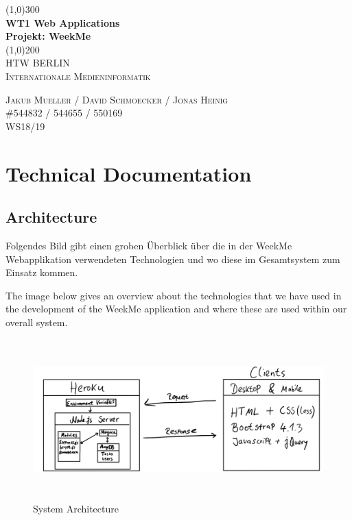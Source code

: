\documentclass[11pt]{article}
\begin{document}
\begin{titlepage} 
	\begin{center}
	\line(1,0){300} \\
	[4mm]
	\huge{\bfseries WT1 Web Applications \\ Projekt: WeekMe} \\  
	[2mm]
	\line(1,0){200}\\	
	[1.5cm]
	\textsc{\LARGE HTW BERLIN}\\
	[0.75cm]
	\textsc{\LARGE Internationale Medieninformatik} \\  
	[9cm]
	\end{center}	 
	\begin{flushright}
		\textsc{\large Jakub Mueller / David Schmoecker / Jonas Heinig \\
		\#544832 / 544655 / 550169 \\
		WS18/19\\}
	\end{flushright} 
	 
	
	
\end{titlepage}  
 

\tableofcontents
  
\cleardoublepage %




\setcounter{page}{1} %

\section{Technical Documentation}

\subsection{Architecture} 
Folgendes Bild gibt einen groben Überblick über die in der WeekMe Webapplikation verwendeten Technologien und wo diese im Gesamtsystem zum Einsatz kommen. 
 
The image below gives an overview about the technologies that we have used in the development of the WeekMe application and where these are used within our overall system.  

	\begin{figure}[H] 
		\centering 
		\includegraphics[height=6.2cm]{figures/architecture}    
		\caption{System Architecture}     
	\end{figure}  
\end{document}
